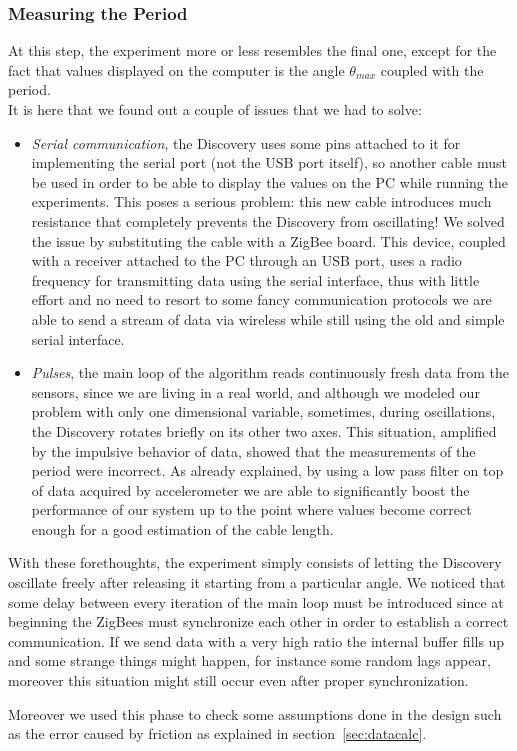 \subsubsection{Measuring the Period}
At this step, the experiment more or less resembles the final one, except for the fact that values displayed on the computer is the angle $\theta_{max}$ coupled with the period. \\
It is here that we found out a couple of issues that we had to solve:
\begin{itemize}
	\item \textit{Serial communication}, the Discovery uses some pins attached to it for implementing the serial port (not the USB port itself), so another cable must be used in order to be able to display the values on the PC while running the experiments. This poses a serious problem: this new cable introduces much resistance that completely prevents the Discovery from oscillating! We solved the issue by substituting the cable with a ZigBee board. This device, coupled with a receiver attached to the PC through an USB port, uses a radio frequency for transmitting data using the serial interface, thus with little effort and no need to resort to some fancy communication protocols we are able to send a stream of data via wireless while still using the old and simple serial interface.
	\item \textit{Pulses}, the main loop of the algorithm reads continuously fresh data from the sensors, since we are living in a real world, and although we modeled our problem with only one dimensional variable, sometimes, during oscillations, the Discovery rotates briefly on its other two axes. This situation, amplified by the impulsive behavior of data, showed that the measurements of the period were incorrect. As already explained, by using a low pass filter on top of data acquired by accelerometer we are able to significantly boost the performance of our system up to the point where values become correct enough for a good estimation of the cable length. 
\end{itemize}
With these forethoughts, the experiment simply consists of letting the Discovery oscillate freely after releasing it starting from a particular angle. We noticed that some delay between every iteration of the main loop must be introduced since at beginning the ZigBees must synchronize each other in order to establish a correct communication. If we send data with a very high ratio the internal buffer fills up and some strange things might happen, for instance some random lags appear, moreover this situation might still occur even after proper synchronization.\par
Moreover we used this phase to check some assumptions done in the design such as the error caused by friction as explained in section~\ref{sec:datacalc}.
